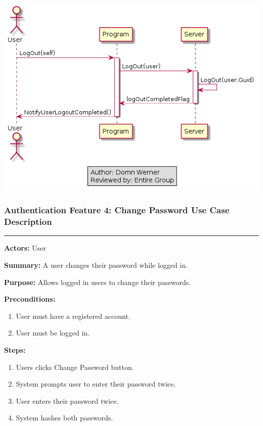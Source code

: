 \documentclass[twoside,letterpaper]{article}
\begin{document}
\bigskip

\includegraphics[width=\textwidth]{images/SequenceDiagrams/AuthenticationLogOut}

\newpage

\subsubsection[Authentication Feature 4: Change Password Use Case Description]{\rmfamily\bfseries\color{black}
	Authentication Feature 4: Change Password Use Case Description}
\hypertarget{RefHeading22059017292}{}

\hrule
\vspace{8pt}
\noindent\textbf{Actors:} User \newline

\noindent\textbf{Summary:} A user changes their password while logged in.  \newline

\noindent\textbf{Purpose:} Allows logged in users to change their passwords.  \newline

\noindent\textbf{Preconditions:}
\begin{enumerate}
	\item User must have a registered account.
	\item User must be logged in.
\end{enumerate}

\noindent\textbf{Steps:}
\begin{enumerate}
	\item Users clicks Change Password button.
	\item System prompts user to enter their password twice.
	\item User enters their password twice.
	\item System hashes both passwords.
\end{enumerate}
\end{document}
